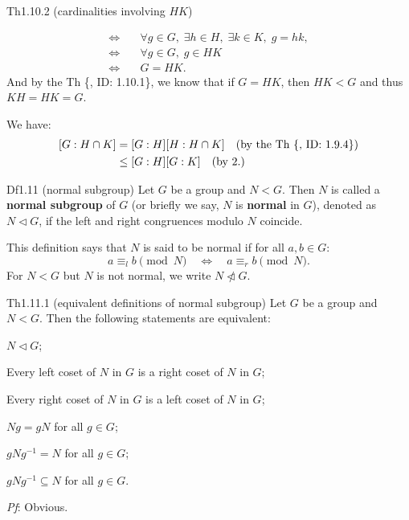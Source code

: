 \documentclass{article}
\newcommand{\notnles}{\ntriangleleft}
\begin{document}
\begin{Th}{Th1.10.2 (cardinalities involving $HK$)}
\begin{compactenum}
$$\begin{aligned}
            \Longleftrightarrow \quad & \forall g\in G,\; \exists h\in H,\; \exists k\in K,\; g = hk, \\
            \Longleftrightarrow \quad & \forall g\in G,\; g\in HK \\
            \Longleftrightarrow \quad & G = HK.
        \end{aligned} $$
        And by the Th \{, ID: 1.10.1\}, we know that if $G = HK$, then $HK < G$ and thus $KH = HK = G$.
        \item We have:
        $$ \begin{aligned}\relax %
            [G:H\cap K] &= [G:H][H:H\cap K] \quad (\text{by the Th \{, ID: 1.9.4\}}) \\
            &\leq [G:H][G:K] \quad (\text{by 2.}) 
        \end{aligned} $$
    \end{compactenum}
\end{Th}

\begin{Df}{Df1.11 (normal subgroup)}
    Let $G$ be a group and $N<G$. Then $N$ is called a \textbf{normal subgroup} of $G$ (or briefly we say, $N$ is \textbf{normal} in $G$), denoted as $N\vartriangleleft G$, if the left and right congruences modulo $N$ coincide.
\end{Df}

\begin{Rmk}{}
    This definition says that $N$ is said to be normal if for all $a, b\in G$:
    $$ a \equiv_l b\pmod{N} \quad \Longleftrightarrow \quad a \equiv_r b\pmod{N}. $$
    \textcolor{Df}{For $N<G$ but $N$ is not normal, we write $N\notnles G$.}
\end{Rmk}

\begin{Th}{Th1.11.1 (equivalent definitions of normal subgroup)}
    Let $G$ be a group and $N<G$. Then the following statements are equivalent:
    \begin{compactenum}
        \item $N\vartriangleleft G$;
        \item Every left coset of $N$ in $G$ is a right coset of $N$ in $G$;
        \item Every right coset of $N$ in $G$ is a left coset of $N$ in $G$;
        \item $Ng = gN$ for all $g\in G$;
        \item $gNg^{-1} = N$ for all $g\in G$;
        \item $gNg^{-1} \subseteq N$ for all $g\in G$.
    \end{compactenum}
    \tcblower
    \textit{Pf}: Obvious.
\end{Th}
\end{document}
